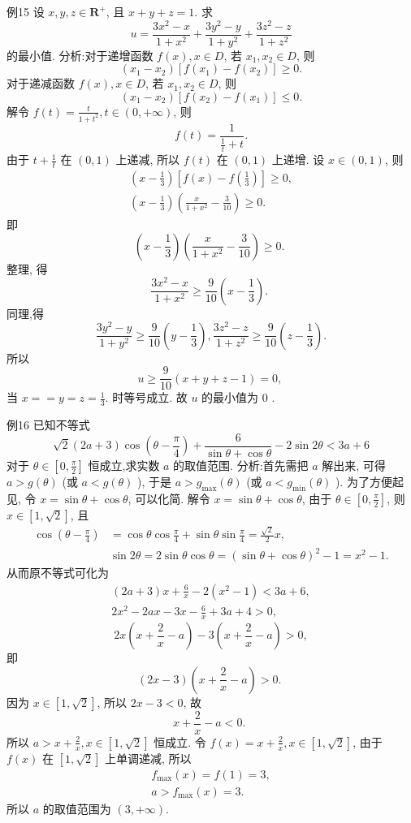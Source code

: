 例15 设 $x, y, z \in \mathbf{R}^{+}$, 且 $x+y+z=1$. 求
$$
u=\frac{3 x^2-x}{1+x^2}+\frac{3 y^2-y}{1+y^2}+\frac{3 z^2-z}{1+z^2}
$$
的最小值.
分析:对于递增函数 $f(x), x \in D$, 若 $x_1, x_2 \in D$, 则
$$
\left(x_1-x_2\right)\left[f\left(x_1\right)-f\left(x_2\right)\right] \geqslant 0 .
$$
对于递减函数 $f(x), x \in D$, 若 $x_1, x_2 \in D$, 则
$$
\left(x_1-x_2\right)\left[f\left(x_2\right)-f\left(x_1\right)\right] \leqslant 0 .
$$
解令 $f(t)=\frac{t}{1+t^2}, t \in(0,+\infty)$, 则
$$
f(t)=\frac{1}{\frac{1}{t}+t} .
$$
由于 $t+\frac{1}{t}$ 在 $(0,1)$ 上递减, 所以 $f(t)$ 在 $(0,1)$ 上递增.
设 $x \in(0,1)$, 则
$$
\begin{gathered}
\left(x-\frac{1}{3}\right)\left[f(x)-f\left(\frac{1}{3}\right)\right] \geqslant 0, \\
\left(x-\frac{1}{3}\right)\left(\frac{x}{1+x^2}-\frac{3}{10}\right) \geqslant 0 .
\end{gathered}
$$
即
$$
\left(x-\frac{1}{3}\right)\left(\frac{x}{1+x^2}-\frac{3}{10}\right) \geqslant 0 \text {. }
$$
整理, 得
$$
\frac{3 x^2-x}{1+x^2} \geqslant \frac{9}{10}\left(x-\frac{1}{3}\right) \text {. }
$$
同理,得
$$
\frac{3 y^2-y}{1+y^2} \geqslant \frac{9}{10}\left(y-\frac{1}{3}\right), \frac{3 z^2-z}{1+z^2} \geqslant \frac{9}{10}\left(z-\frac{1}{3}\right) .
$$
所以
$$
u \geqslant \frac{9}{10}(x+y+z-1)=0 \text {, }
$$
当 $x==y=z=\frac{1}{3}$. 时等号成立.
故 $u$ 的最小值为 0 .



例16 已知不等式
$$
\sqrt{2}(2 a+3) \cos \left(\theta-\frac{\pi}{4}\right)+\frac{6}{\sin \theta+\cos \theta}-2 \sin 2 \theta<3 a+6
$$
对于 $\theta \in\left[0, \frac{\pi}{2}\right]$ 恒成立,求实数 $a$ 的取值范围.
分析:首先需把 $a$ 解出来, 可得 $a>g(\theta)$ (或 $a<g(\theta)$ ), 于是 $a>g_{\max }(\theta)$ (或 $a<g_{\min }(\theta)$ ). 为了方便起见, 令 $x=\sin \theta+\cos \theta$, 可以化简.
解令 $x=\sin \theta+\cos \theta$, 由于 $\theta \in\left[0, \frac{\pi}{2}\right]$, 则 $x \in[1, \sqrt{2}]$, 且
$$
\begin{aligned}
\cos \left(\theta-\frac{\pi}{4}\right) & =\cos \theta \cos \frac{\pi}{4}+\sin \theta \sin \frac{\pi}{4}=\frac{\sqrt{2}}{2} x, \\
& \sin 2 \theta=2 \sin \theta \cos \theta=(\sin \theta+\cos \theta)^2-1=x^2-1 .
\end{aligned}
$$
从而原不等式可化为
$$
\begin{gathered}
(2 a+3) x+\frac{6}{x}-2\left(x^2-1\right)<3 a+6, \\
2 x^2-2 a x-3 x-\frac{6}{x}+3 a+4>0,
\end{gathered}
$$
$$
2 x\left(x+\frac{2}{x}-a\right)-3\left(x+\frac{2}{x}-a\right)>0,
$$
即
$$
(2 x-3)\left(x+\frac{2}{x}-a\right)>0 \text {. }
$$
因为 $x \in[1, \sqrt{2}]$, 所以 $2 x-3<0$, 故
$$
x+\frac{2}{x}-a<0 \text {. }
$$
所以 $a>x+\frac{2}{x}, x \in[1, \sqrt{2}]$ 恒成立.
令 $f(x)=x+\frac{2}{x}, x \in[1, \sqrt{2}]$, 由于 $f(x)$ 在 $[1, \sqrt{2}]$ 上单调递减, 所以
$$
\begin{gathered}
f_{\max }(x)=f(1)=3, \\
a>f_{\max }(x)=3 .
\end{gathered}
$$
所以 $a$ 的取值范围为 $(3,+\infty)$.


